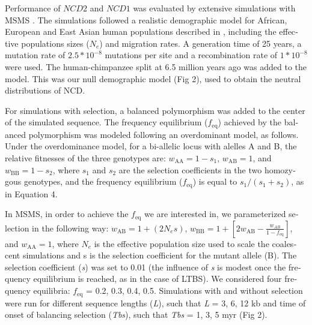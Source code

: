 \begin{refsection}
\begin{otherlanguage}{english}
	Performance of $NCD2$ and $NCD1$ was evaluated by extensive simulations with MSMS \parencite{Ewing2010}. The simulations followed a realistic demographic model for African, European and East Asian human populations described in \textcite{Gravel2011}, including the effective populations sizes ($N_{e}$) and migration rates. A generation time of 25 years, a mutation rate of $2.5 * 10^{-8}$ mutations per site \parencite{Nachman2000} and a recombination rate of $1 * 10^{-8}$ were used. The human-chimpanzee split at 6.5 million years ago was added to the model. This was our null demographic model (Fig 2), used to obtain the neutral distributions of NCD.

For simulations with selection, a balanced polymorphism was added to the center of the simulated sequence. The frequency equilibrium ($f_{\mathrm{eq}}$) achieved by the balanced polymorphism was modeled following an overdominant model, as follows. Under the overdominance model, for a bi-allelic locus with alelles A and B, the relative fitnesses of the three genotypes are: $w_{\mathrm{AA}} = 1 - s_{1}$, $w_{\mathrm{AB}} = 1$, and $w_{\mathrm{BB}} = 1 - s_{2}$, where $s_{1}$ and $s_{2}$ are the selection coefficients in the two homozygous genotypes, and the frequency equilibrium ($f_{\mathrm{eq}}$) is equal to $s_{1}/(s_{1}+s_{2})$, as in Equation 4. 

In MSMS, in order to achieve the $f_{\mathrm{eq}}$ we are interested in, we parameterized selection in the following way:  $w_{\mathrm{AB}} = 1+(2N_{e}s)$, $w_{\mathrm{BB}} =1 + [2w_{\mathrm{AB}} - \frac{w_{AB}}{1-f_{\mathrm{eq}}}]$, and $w_{\mathrm{AA}} = 1$, where $N_{e}$ is the effective population size used to scale the coalescent simulations and s is the selection coefficient for the mutant allele (B). The selection coefficient (\emph{s}) was set to 0.01 (the influence of \emph{s} is modest once the frequency equilibrium is reached, as in the case of LTBS). We considered four frequency equilibria: $f_{\mathrm{eq}}$ = 0.2, 0.3, 0.4, 0.5. Simulations with and without selection were run for different sequence lengths (\emph{L}), such that \emph{L} = 3, 6, 12 kb and time of onset of balancing selection (\emph{Tbs}), such that \emph{Tbs} = 1, 3, 5 myr (Fig 2).


\end{otherlanguage}
\end{refsection}
